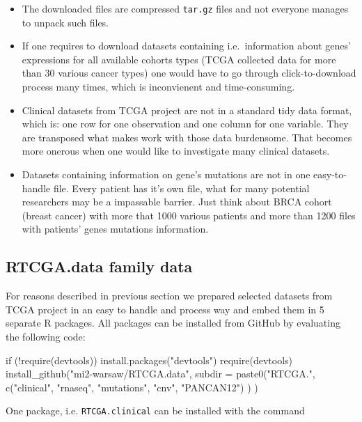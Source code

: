 \begin{itemize}
\itemsep1pt\parskip0pt
\item
  The downloaded files are compressed \texttt{tar.gz} files and not
  everyone manages to unpack such files.
\item
  If one requires to download datasets containing i.e.~information about
  genes' expressions for all available cohorts types (TCGA collected
  data for more than 30 various cancer types) one would have to go
  through click-to-download process many times, which is inconvienent
  and time-consuming.
\item
  Clinical datasets from TCGA project are not in a standard tidy data
  format, which is: one row for one observation and one column for one
  variable. They are transposed what makes work with those data
  burdensome. That becomes more onerous when one would like to
  investigate many clinical datasets.
\item
  Datasets containing information on gene's mutations are not in one
  easy-to-handle file. Every patient has it's own file, what for many
  potential researchers may be a impassable barrier. Just think about
  BRCA cohort (breast cancer) with more that 1000 various patients and
  more than 1200 files with patients' genes mutations information.
\end{itemize}

\subsection{RTCGA.data family data}\label{rtcga.data-family-data}

For reasons described in previous section we prepared selected datasets
from TCGA project in an easy to handle and process way and embed them in
5 separate R packages. All packages can be installed from GitHub by
evaluating the following code:

\begin{Schunk}
\begin{Sinput}
if (!require(devtools)) {
    install.packages("devtools")
    require(devtools)
}
install_github("mi2-warsaw/RTCGA.data", 
                subdir = paste0("RTCGA.", 
                                c("clinical", "rnaseq", "mutations", "cnv", "PANCAN12")
                               )
 )
\end{Sinput}
\end{Schunk}

One package, i.e. \texttt{RTCGA.clinical} can be installed with the
command

